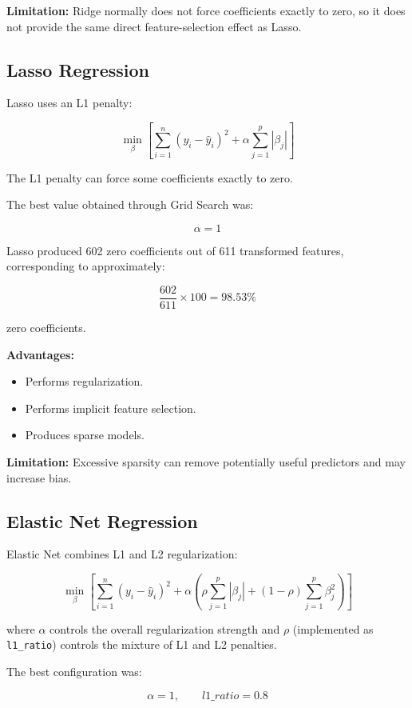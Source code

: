 \documentclass[12pt,a4paper]{article}
\begin{document}
\textbf{Limitation:} Ridge normally does not force coefficients exactly to zero, so it does not provide the same direct feature-selection effect as Lasso.

\subsection{Lasso Regression}

Lasso uses an L1 penalty:

\[
\min_{\beta}
\left[
\sum_{i=1}^{n}(y_i-\hat{y}_i)^2
+
\alpha\sum_{j=1}^{p}|\beta_j|
\right]
\]

The L1 penalty can force some coefficients exactly to zero.

The best value obtained through Grid Search was:

\[
\alpha=1
\]

Lasso produced 602 zero coefficients out of 611 transformed features, corresponding to approximately:

\[
\frac{602}{611}\times100 = 98.53\%
\]

zero coefficients.

\textbf{Advantages:}

\begin{itemize}
    \item Performs regularization.
    \item Performs implicit feature selection.
    \item Produces sparse models.
\end{itemize}

\textbf{Limitation:} Excessive sparsity can remove potentially useful predictors and may increase bias.

\subsection{Elastic Net Regression}

Elastic Net combines L1 and L2 regularization:

\[
\min_{\beta}
\left[
\sum_{i=1}^{n}(y_i-\hat{y}_i)^2
+
\alpha
\left(
\rho\sum_{j=1}^{p}|\beta_j|
+
(1-\rho)\sum_{j=1}^{p}\beta_j^2
\right)
\right]
\]

where $\alpha$ controls the overall regularization strength and $\rho$ (implemented as \texttt{l1\_ratio}) controls the mixture of L1 and L2 penalties.

The best configuration was:

\[
\alpha=1,\qquad l1\_ratio=0.8
\]
\end{document}
